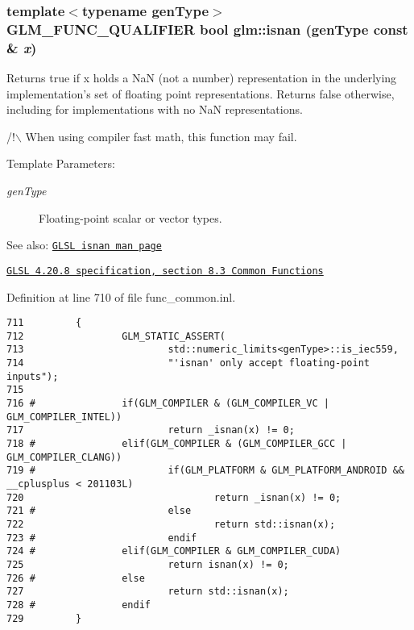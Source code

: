 \hypertarget{group__core__func__common_g64fb2e954341050194ba445111be01f7}{
\subsubsection[isnan]{\setlength{\rightskip}{0pt plus 5cm}template$<$typename genType$>$ GLM\_\-FUNC\_\-QUALIFIER bool glm::isnan (genType const \& {\em x})}}
\label{group__core__func__common_g64fb2e954341050194ba445111be01f7}


Returns true if x holds a NaN (not a number) representation in the underlying implementation's set of floating point representations. Returns false otherwise, including for implementations with no NaN representations.

/!$\backslash$ When using compiler fast math, this function may fail.

\begin{Desc}
\item[Template Parameters:]
\begin{description}
\item[{\em genType}]Floating-point scalar or vector types.\end{description}
\end{Desc}
\begin{Desc}
\item[See also:]\href{http://www.opengl.org/sdk/docs/manglsl/xhtml/isnan.xml}{\tt GLSL isnan man page} 

\href{http://www.opengl.org/registry/doc/GLSLangSpec.4.20.8.pdf}{\tt GLSL 4.20.8 specification, section 8.3 Common Functions} \end{Desc}


Definition at line 710 of file func\_\-common.inl.

\begin{Code}\begin{verbatim}711         {
712                 GLM_STATIC_ASSERT(
713                         std::numeric_limits<genType>::is_iec559,
714                         "'isnan' only accept floating-point inputs");
715 
716 #               if(GLM_COMPILER & (GLM_COMPILER_VC | GLM_COMPILER_INTEL))
717                         return _isnan(x) != 0;
718 #               elif(GLM_COMPILER & (GLM_COMPILER_GCC | GLM_COMPILER_CLANG))
719 #                       if(GLM_PLATFORM & GLM_PLATFORM_ANDROID && __cplusplus < 201103L)
720                                 return _isnan(x) != 0;
721 #                       else
722                                 return std::isnan(x);
723 #                       endif
724 #               elif(GLM_COMPILER & GLM_COMPILER_CUDA)
725                         return isnan(x) != 0;
726 #               else
727                         return std::isnan(x);
728 #               endif
729         }
\end{verbatim}
\end{Code}


